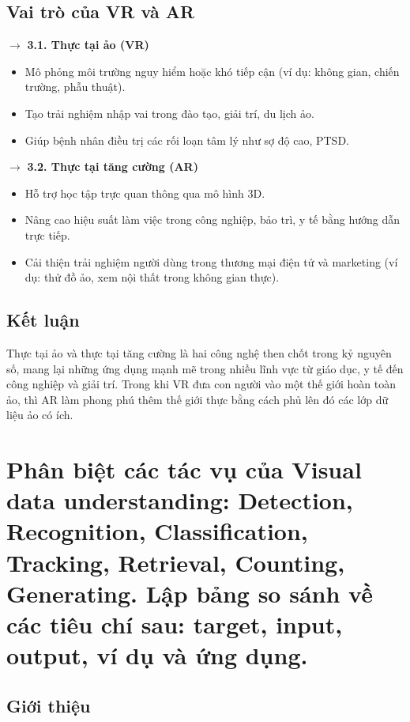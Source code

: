 \documentclass[12pt]{article}
\begin{document}
	\subsection{Vai trò của VR và AR}
	
	$\rightarrow$ \textbf{3.1. Thực tại ảo (VR)}
	
	\begin{itemize}
	\item Mô phỏng môi trường nguy hiểm hoặc khó tiếp cận (ví dụ: không gian, chiến trường, phẫu thuật).
	\item Tạo trải nghiệm nhập vai trong đào tạo, giải trí, du lịch ảo.
	\item Giúp bệnh nhân điều trị các rối loạn tâm lý như sợ độ cao, PTSD.
	\end{itemize}
	
	$\rightarrow$ \textbf{3.2. Thực tại tăng cường (AR)}
	
	\begin{itemize}
	\item Hỗ trợ học tập trực quan thông qua mô hình 3D.
	\item Nâng cao hiệu suất làm việc trong công nghiệp, bảo trì, y tế bằng hướng dẫn trực tiếp.
	\item Cải thiện trải nghiệm người dùng trong thương mại điện tử và marketing (ví dụ: thử đồ ảo, xem nội thất trong không gian thực).
	\end{itemize}
	
	\subsection{Kết luận}
	
	Thực tại ảo và thực tại tăng cường là hai công nghệ then chốt trong kỷ nguyên số, mang lại những ứng dụng mạnh mẽ trong nhiều lĩnh vực từ giáo dục, y tế đến công nghiệp và giải trí. Trong khi VR đưa con người vào một thế giới hoàn toàn ảo, thì AR làm phong phú thêm thế giới thực bằng cách phủ lên đó các lớp dữ liệu ảo có ích.
	
	\section{Phân biệt các tác vụ của Visual data understanding: Detection, Recognition, Classification, Tracking, Retrieval, Counting, Generating. Lập bảng so sánh về các tiêu chí sau: target, input, output, ví dụ và ứng dụng. }
	
	\subsection{Giới thiệu}
	
\end{document}
